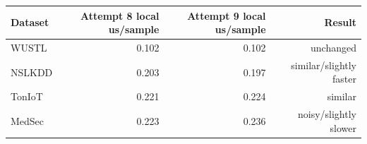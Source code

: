 \begin{tabular}{lrrr}
\toprule
Dataset & Attempt 8 local us/sample & Attempt 9 local us/sample & Result \\
\midrule
WUSTL & 0.102 & 0.102 & unchanged \\
NSLKDD & 0.203 & 0.197 & similar/slightly faster \\
TonIoT & 0.221 & 0.224 & similar \\
MedSec & 0.223 & 0.236 & noisy/slightly slower \\
\bottomrule
\end{tabular}
